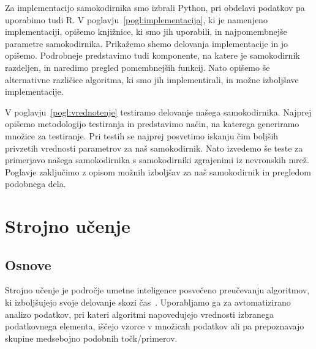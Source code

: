 \documentclass[12pt,a4paper,twoside]{article}
\theoremstyle{definition} %
\theoremstyle{plain} %
\numberwithin{equation}{section}  %
\begin{document}
Za implementacijo samokodirnika smo izbrali Python, pri obdelavi podatkov pa uporabimo tudi R.
V poglavju~\ref{pogl:implementacija}, ki je namenjeno implementaciji, opišemo knjižnice, ki smo jih uporabili, in najpomembnejše parametre samokodirnika.
Prikažemo shemo delovanja implementacije in jo opišemo.
Podrobneje predstavimo tudi komponente, na katere je samokodirnik razdeljen, in naredimo pregled pomembnejših funkcij.
Nato opišemo še alternativne različice algoritma, ki smo jih implementirali, in možne izboljšave implementacije.

V poglavju~\ref{pogl:vrednotenje} testiramo delovanje našega samokodirnika.
Najprej opišemo metodologijo testiranja in predstavimo način, na katerega generiramo množice za testiranje.
Pri testih se najprej posvetimo iskanju čim boljših privzetih vrednosti parametrov za naš samokodirnik.
Nato izvedemo še teste za primerjavo našega samokodirnika s samokodirniki zgrajenimi iz nevronskih mrež.
Poglavje zaključimo z opisom možnih izboljšav za naš samokodirnik in pregledom podobnega dela.


\section{Strojno učenje}
\label{pogl:strojno_ucenje}

\subsection{Osnove}


Strojno učenje je področje umetne inteligence posvečeno preučevanju algoritmov, 
ki izboljšujejo svoje delovanje skozi čas~\cite{hastie2009elements}. %
Uporabljamo ga za avtomatizirano analizo podatkov, pri kateri algoritmi napovedujejo vrednosti izbranega podatkovnega elementa,
iščejo vzorce v množicah podatkov ali pa prepoznavajo skupine medsebojno podobnih točk/primerov. 
\end{document}
